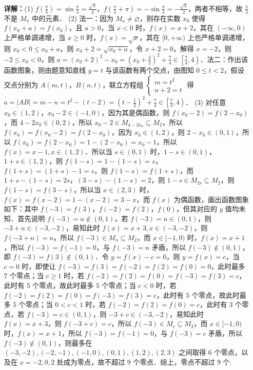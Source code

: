 \begin{question}[points=18]
\begin{solution}
\textbf{详解：}(1) $f\left(\frac{\pi}{3}\right) = \sin\frac{\pi}{3} = \frac{\sqrt{3}}{2}$，$f\left(\frac{\pi}{3} + \pi\right) = -\sin\frac{\pi}{3} = -\frac{\sqrt{3}}{2}$，两者不相等，故 $\frac{\pi}{3}$ 不是 $M_\pi$ 中的元素．
(2) 法一：因为 $M_a \neq \varnothing$，则存在实数 $x_0$ 使得 $f(x_0 + a) = f(x_0)$，且 $a > 0$，当 $x < 0$ 时，$f(x) = x+2$，其在 $(-\infty, 0)$ 上严格单调递增，当 $x \geq 0$ 时，$f(x) = \sqrt{x}$，其在 $[0, +\infty)$ 上也严格单调递增，则 $x_0 < 0 \leq x_0 + a$，则 $x_0 + 2 = \sqrt{x_0 + a}$，令 $x+2 = 0$，解得 $x = -2$，则 $-2 \leq x_0 < 0$，则 $a = (x_0 + 2)^2 - x_0 = \left(x_0 + \frac{3}{2}\right)^2 + \frac{7}{4} \in \left[\frac{7}{4}, 4\right)$．法二：作出该函数图象，则由题意知直线 $y = t$ 与该函数有两个交点，由图知 $0 \leq t < 2$，假设交点分别为 $A(m, t)$，$B(n, t)$，联立方程组 $\begin{cases} m = t^2 \\ n+2 = t \end{cases}$ 得 $a = |AB| = m - n = t^2 - (t-2) = \left(t - \frac{1}{2}\right)^2 + \frac{7}{4} \in \left[\frac{7}{4}, 4\right)$．
(3) 对任意 $x_0 \in (1,2)$，$x_0 - 2 \in (-1,0)$，因为其是偶函数，则 $f(x_0 - 2) = f(2 - x_0)$，而 $4 - 2x_0 \in (0,2)$，所以 $x_0 - 2 \in M_{4-2x_0} \subseteq M_2$，所以 $f(x_0) = f(x_0 - 2) = f(2 - x_0)$，因为 $x_0 \in (1,2)$，则 $2 - x_0 \in (0,1)$，所以 $f(x_0) = f(2 - x_0) = 1 - (2 - x_0) = x_0 - 1$，所以 $f(x) = x - 1, x \in (1,2)$．所以当 $s \in (0,1)$ 时，$1-s \in (0,1)$，$1+s \in (1,2)$，则 $f(1-s) = 1 - (1-s) = s$，$f(1+s) = (1+s) - 1 = s$，则 $f(1-s) = f(1+s)$，而 $1+s - (1-s) = 2s$，$(3-s) - (1-s) = 2$，则 $1-s \in M_{2s} \subseteq M_2$，则 $f(1-s) = f(3-s)$，所以当 $x \in (2,3)$ 时，$f(x) = f(x-2) = 1 - (x-2) = 3 - x$，而 $f(x)$ 为偶函数，画出函数图象如下：其中 $f(-3) = f(3)$，$f(-2) = f(2)$，$f(0)$，但其对应的 $y$ 值均未知．首先说明 $f(-3) = n \notin (0,1)$，若 $f(-3) = n \in (0,1)$，则 $-3+n \in (-3,-2)$，易知此时 $f(x) = x+3, x \in (-3,-2)$，则 $f(-3+n) = n$，所以 $f(-3) \in M_n \subseteq M_2$，而 $x \in [-1,0)$ 时，$f(x) = x+1$，所以 $f(-3) = f(-1) = 0$，与 $f(-3) = n$ 矛盾，所以 $f(-3) \notin (0,1)$，即 $f(-3) = f(3) \notin (0,1)$．令 $y = f(x) - c = 0$，则 $y = f(x) = c$，当 $c = 0$ 时，即使让 $f(-3) = f(3) = f(-2) = f(2) = f(0) = 0$，此时最多 $7$ 个零点；当 $c \geq 1$ 时，若 $f(-2) = f(2) = f(0) = f(-3) = f(3) = c$，此时有 $5$ 个零点，故此时最多 $5$ 个零点；当 $c < 0$ 时，若 $f(-2) = f(2) = f(0) = f(-3) = f(3) = c$，此时有 $5$ 个零点，故此时最多 $5$ 个零点；当 $0 < c < 1$ 时，若 $f(-2) = f(2) = f(0) = c$，此时有 $3$ 个零点，若 $f(-3) = c \in (0,1)$，则 $-3+c \in (-3,-2)$，易知此时 $f(x) = x+3$，则 $f(-3+c) = c$，所以 $f(-3) \in M_c \subseteq M_2$，而 $x \in [-1,0)$ 时，$f(x) = x+1$，所以 $f(-3) = f(-1) = 0$，与 $f(-3) = c$ 矛盾，所以 $f(-3) \notin (0,1)$，则最多在 $(-3,-2), (-2,-1), (-1,0), (0,1), (1,2), (2,3)$ 之间取得 $6$ 个零点，以及在 $x = -2, 0, 2$ 处成为零点，故不超过 $9$ 个零点．综上，零点不超过 $9$ 个.
\end{solution}
\end{question}

